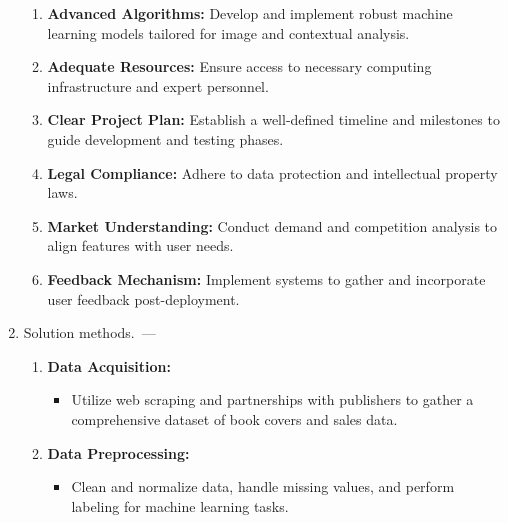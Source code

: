 \documentclass[12pt]{article}
\begin{document}
\begin{enumerate}
\begin{enumerate}
                                                                         \item \textbf{Advanced Algorithms:} Develop and implement robust machine learning models tailored for image and contextual analysis.

                                                                         \item \textbf{Adequate Resources:} Ensure access to necessary computing infrastructure and expert personnel.

                                                                         \item \textbf{Clear Project Plan:} Establish a well-defined timeline and milestones to guide development and testing phases.

                                                                         \item \textbf{Legal Compliance:} Adhere to data protection and intellectual property laws.

                                                                         \item \textbf{Market Understanding:} Conduct demand and competition analysis to align features with user needs.

                                                                         \item \textbf{Feedback Mechanism:} Implement systems to gather and incorporate user feedback post-deployment.
\end{enumerate}
\item Solution methods.~---\begin{enumerate}
                               \item \textbf{Data Acquisition:}
                               \begin{itemize}
                                   \item Utilize web scraping and partnerships with publishers to gather a comprehensive dataset of book covers and sales data.
                               \end{itemize}

                               \item \textbf{Data Preprocessing:}
                               \begin{itemize}
                                   \item Clean and normalize data, handle missing values, and perform labeling for machine learning tasks.
                               \end{itemize}


\end{enumerate}
\end{enumerate}
\end{document}
